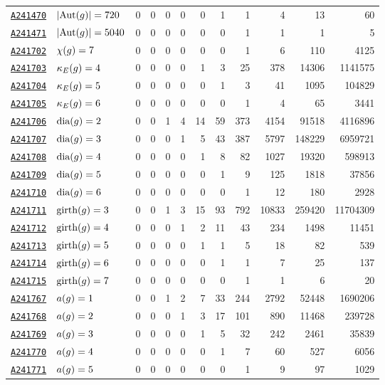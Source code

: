 \documentclass[12pt]{article}
\newcommand{\OEIS}[1]
{\href{https://oeis.org/#1}{\texttt{#1}}}
\begin{document}
\begin{appendices}
\begin{longtable}{ l l r r r r r r r r r r}
\OEIS{A241470} & $| \text{Aut}(g) | =720$ & 0 & 0 & 0 & 0 & 0 & 1 & 1 & 4 & 13 & 60 \\
\OEIS{A241471} & $| \text{Aut}(g) | =5040$ & 0 & 0 & 0 & 0 & 0 & 0 & 1 & 1 & 1 & 5 \\
\OEIS{A241702} & $\chi(g) =7$ & 0 & 0 & 0 & 0 & 0 & 0 & 1 & 6 & 110 & 4125 \\
\OEIS{A241703} & $\kappa_{E}(g) =4$ & 0 & 0 & 0 & 0 & 1 & 3 & 25 & 378 & 14306 & 1141575 \\
\OEIS{A241704} & $\kappa_{E}(g) =5$ & 0 & 0 & 0 & 0 & 0 & 1 & 3 & 41 & 1095 & 104829 \\
\OEIS{A241705} & $\kappa_{E}(g) =6$ & 0 & 0 & 0 & 0 & 0 & 0 & 1 & 4 & 65 & 3441 \\
\OEIS{A241706} & $\text{dia}(g) =2$ & 0 & 0 & 1 & 4 & 14 & 59 & 373 & 4154 & 91518 & 4116896 \\
\OEIS{A241707} & $\text{dia}(g) =3$ & 0 & 0 & 0 & 1 & 5 & 43 & 387 & 5797 & 148229 & 6959721 \\
\OEIS{A241708} & $\text{dia}(g) =4$ & 0 & 0 & 0 & 0 & 1 & 8 & 82 & 1027 & 19320 & 598913 \\
\OEIS{A241709} & $\text{dia}(g) =5$ & 0 & 0 & 0 & 0 & 0 & 1 & 9 & 125 & 1818 & 37856 \\
\OEIS{A241710} & $\text{dia}(g) =6$ & 0 & 0 & 0 & 0 & 0 & 0 & 1 & 12 & 180 & 2928 \\
\OEIS{A241711} & $\text{girth}(g) =3$ & 0 & 0 & 1 & 3 & 15 & 93 & 792 & 10833 & 259420 & 11704309 \\
\OEIS{A241712} & $\text{girth}(g) =4$ & 0 & 0 & 0 & 1 & 2 & 11 & 43 & 234 & 1498 & 11451 \\
\OEIS{A241713} & $\text{girth}(g) =5$ & 0 & 0 & 0 & 0 & 1 & 1 & 5 & 18 & 82 & 539 \\
\OEIS{A241714} & $\text{girth}(g) =6$ & 0 & 0 & 0 & 0 & 0 & 1 & 1 & 7 & 25 & 137 \\
\OEIS{A241715} & $\text{girth}(g) =7$ & 0 & 0 & 0 & 0 & 0 & 0 & 1 & 1 & 6 & 20 \\
\OEIS{A241767} & $a(g) =1$ & 0 & 0 & 1 & 2 & 7 & 33 & 244 & 2792 & 52448 & 1690206 \\
\OEIS{A241768} & $a(g) =2$ & 0 & 0 & 0 & 1 & 3 & 17 & 101 & 890 & 11468 & 239728 \\
\OEIS{A241769} & $a(g) =3$ & 0 & 0 & 0 & 0 & 1 & 5 & 32 & 242 & 2461 & 35839 \\
\OEIS{A241770} & $a(g) =4$ & 0 & 0 & 0 & 0 & 0 & 1 & 7 & 60 & 527 & 6056 \\
\OEIS{A241771} & $a(g) =5$ & 0 & 0 & 0 & 0 & 0 & 0 & 1 & 9 & 97 & 1029 \\
\end{longtable}


\end{appendices}
\end{document}
